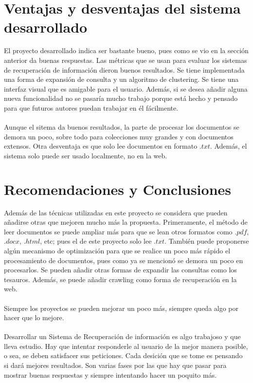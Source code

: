 \documentclass{llncs}
\begin{document}
 
%
\section{Ventajas y desventajas del sistema desarrollado}
% 

El proyecto desarrollado indica ser bastante bueno, pues como se vio en la secci\'on anterior da buenas respuestas. Las m\'etricas que se usan para evaluar los sistemas de recuperaci\'on de informaci\'on dieron buenos resultados. Se tiene implementada una forma de expansi\'on de consulta y un algoritmo de clustering. Se tiene una interfaz visual que es amigable para el usuario. Adem\'as, si se desea a\~nadir alguna nueva funcionalidad no se pasar\'ia mucho trabajo porque est\'a hecho y pensado para que futuros autores puedan trabajar en \'el f\'acilmente.\\
\\
Aunque el sitema da buenos resultados, la parte de procesar los documentos se demora un poco, sobre todo para colecciones muy grandes y con documentos extensos. Otra desventaja es que solo lee documentos en formato $.txt$. Adem\'as, el sistema solo puede ser usado localmente, no en la web.\\

%
\section{Recomendaciones y Conclusiones}
% 

Adem\'as de las t\'ecnicas utilizadas en este proyecto se considera que pueden a\~nadirse otras que mejoren mucho m\'as la propuesta. Primeramente, el m\'etodo de leer documentos se puede ampliar m\'as para que se lean otros formatos como $.pdf$, $.docx$, $.html$, etc; pues el de este proyecto solo lee $.txt$. Tambi\'en puede proponerse alg\'un mecanismo de optimizaci\'on para que se realice un poco m\'as r\'apido el procesamiento de documentos, pues como ya se mencion\'o se demora un poco en procesarlos. Se pueden a\~nadir otras formas de expandir las consultas como los tesauros. Adem\'as, se puede a\~nadir crawling como forma de recuperaci\'on en la web.\\
\\
Siempre los proyectos se pueden mejorar un poco m\'as, siempre queda algo por hacer que lo mejore.\\
\\
Desarrollar un Sistema de Recuperaci\'on de informaci\'on es algo trabajoso y que lleva estudio. Hay que intentar responderle al usuario de la mejor manera posible, o sea, se deben satisfacer sus peticiones. Cada desici\'on que se tome es pensando si dar\'a mejores resultados. Son varias fases por las que hay que pasar para mostrar buenas respuestas y siempre intentando hacer un poquito m\'as.\\
\end{document}
